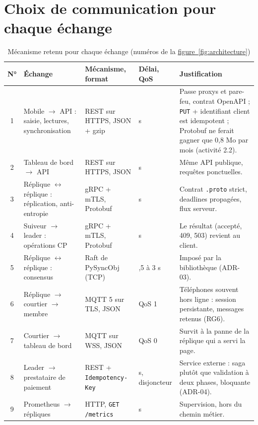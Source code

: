\documentclass[12pt,a4paper]{article}
\newcommand{\figref}[1]{\hyperref[#1]{figure~\ref*{#1}}}
\begin{document}
\section{Choix de communication pour chaque échange}
\label{sec:choix}

\begin{table}[H]
\centering
\small
{}
\begin{tabularx}{\linewidth}{@{}c >{\raggedright\arraybackslash}p{3.2cm} >{\raggedright\arraybackslash}p{3.0cm} >{\raggedright\arraybackslash}p{1.45cm} >{\raggedright\arraybackslash}X@{}}
\toprule
\textbf{N°} & \textbf{Échange} & \textbf{Mécanisme, format} & \textbf{Délai, QoS} & \textbf{Justification} \\
\midrule
1 & Mobile $\rightarrow$ API : saisie, lectures, synchronisation & REST sur HTTPS, JSON + gzip & 5 s &
  Passe proxys et pare-feu, contrat OpenAPI ; \texttt{PUT} + identifiant client est idempotent ;
  Protobuf ne ferait gagner que 0,8 Mo par mois (activité 2.2). \\
2 & Tableau de bord $\rightarrow$ API & REST sur HTTPS, JSON & 5 s & Même API publique, requêtes ponctuelles. \\
3 & Réplique $\leftrightarrow$ réplique : réplication, anti-entropie & gRPC + mTLS, Protobuf & 2 s &
  Contrat \texttt{.proto} strict, deadlines propagées, flux serveur. \\
4 & Suiveur $\rightarrow$ leader : opérations CP & gRPC + mTLS, Protobuf & 2 s & Le résultat (accepté, 409, 503) revient au client. \\
5 & Réplique $\leftrightarrow$ réplique : consensus & Raft de PySyncObj (TCP) & 1,5 à 3 s & Imposé par la bibliothèque (ADR-03). \\
6 & Réplique $\rightarrow$ courtier $\rightarrow$ membre & MQTT 5 sur TLS, JSON & QoS 1 &
  Téléphones souvent hors ligne : session persistante, messages retenus (RG6). \\
7 & Courtier $\rightarrow$ tableau de bord & MQTT sur WSS, JSON & QoS 0 & Survit à la panne de la réplique qui a servi la page. \\
8 & Leader $\rightarrow$ prestataire de paiement & REST + \texttt{Idempotency-Key} & 5 s, disjoncteur &
  Service externe : saga plutôt que validation à deux phases, bloquante (ADR-04). \\
9 & Prometheus $\rightarrow$ répliques & HTTP, \texttt{GET /metrics} & 5 s & Supervision, hors du chemin métier. \\
\bottomrule
\end{tabularx}
\caption{Mécanisme retenu pour chaque échange (numéros de la \figref{fig:architecture})}
\label{tab:echanges}
\end{table}
\end{document}
